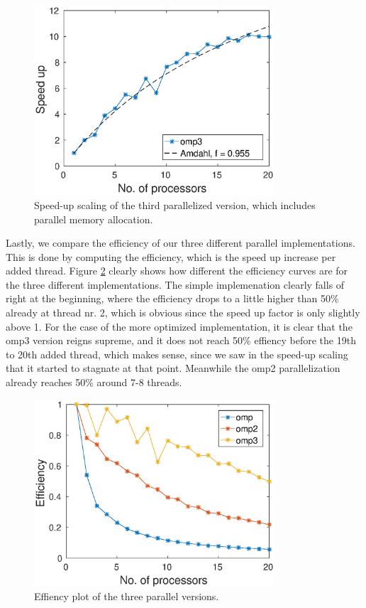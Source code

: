\begin{figure}[h!]
\centering
\includegraphics[width = 0.8\textwidth]{fig/speedup_omp3.eps}
\caption{Speed-up scaling of the third parallelized version, which includes parallel memory allocation.}
\label{fig:omp3_scale}
\end{figure}


Lastly, we compare the efficiency of our three different parallel implementations. This is done by computing the efficiency, which is the speed up increase per added thread. Figure \ref{fig:omp_eff} clearly shows how different the efficiency curves are for the three different implementations. The simple implemenation clearly falls of right at the beginning, where the efficiency drops to a little higher than 50\% already at thread nr. 2, which is obvious since the speed up factor is only slightly above 1. For the case of the more optimized implementation, it is clear that the omp3 version reigns supreme, and it does not reach 50\% effiency before the 19th to 20th added thread, which makes sense, since we saw in the speed-up scaling that it started to stagnate at that point. Meanwhile the omp2 parallelization already reaches 50\% around 7-8 threads.

\begin{figure}[h!]
\centering
\includegraphics[width = 0.8\textwidth]{fig/efficiency_omp_omp2_omp3.eps}
\caption{Effiency plot of the three parallel versions.}
\label{fig:omp_eff}
\end{figure}
